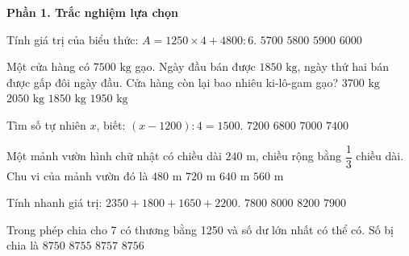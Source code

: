 \textbf{Phần 1. Trắc nghiệm lựa chọn}

\begin{ex} %
Tính giá trị của biểu thức: $A = 1250 \times 4 + 4800 : 6$.
\choice
{$5700$}
{\True $5800$}
{$5900$}
{$6000$}
\end{ex}

\begin{ex} %
Một cửa hàng có $7500\text{ kg}$ gạo. Ngày đầu bán được $1850\text{ kg}$, ngày thứ hai bán được gấp đôi ngày đầu. Cửa hàng còn lại bao nhiêu ki-lô-gam gạo?
\choice
{$3700\text{ kg}$}
{$2050\text{ kg}$}
{$1850\text{ kg}$}
{\True $1950\text{ kg}$}
\end{ex}

\begin{ex} %
Tìm số tự nhiên $x$, biết: $(x - 1200) : 4 = 1500$.
\choice
{\True $7200$}
{$6800$}
{$7000$}
{$7400$}
\end{ex}

\begin{ex} %
Một mảnh vườn hình chữ nhật có chiều dài $240\text{ m}$, chiều rộng bằng $\dfrac{1}{3}$ chiều dài. Chu vi của mảnh vườn đó là
\choice
{$480\text{ m}$}
{$720\text{ m}$}
{\True $640\text{ m}$}
{$560\text{ m}$}
\end{ex}

\begin{ex} %
Tính nhanh giá trị: $2350 + 1800 + 1650 + 2200$.
\choice
{$7800$}
{\True $8000$}
{$8200$}
{$7900$}
\end{ex}

\begin{ex} %
Trong phép chia cho 7 có thương bằng 1250 và số dư lớn nhất có thể có. Số bị chia là
\choice
{$8750$}
{$8755$}
{$8757$}
{\True $8756$}
\end{ex}

